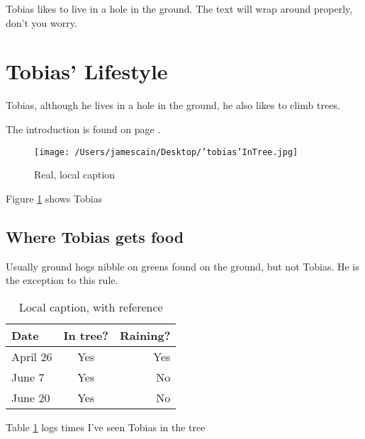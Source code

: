 \documentclass{article}
\begin{document}
Tobias likes to live in a hole in the ground. The text will wrap around properly, don't you worry.

\lipsum[1]


\newpage
\section{Tobias' Lifestyle}
Tobias, although he lives in a hole in the ground, he also likes to climb trees.

The introduction is found on page \pageref{sec:intro}.

\begin{figure}[H]
    \centering
    \texttt{[image: /Users/jamescain/Desktop/'tobias'InTree.jpg]}
    \caption[Optional caption]{Real, local caption}
    \label{fig:tobias}
\end{figure}

Figure \ref{fig:tobias} shows Tobias

\subsection{Where Tobias gets food}
Usually ground hogs nibble on greens found on the ground, but not Tobias. He is the exception to this rule.

\begin{table}[H]
    \centering
    \caption[This is optional caption, without reference]{Local caption, with reference}
    \label{tab:tobiastreesightings}
    \begin{tabular}{ l c r}
        \bfseries{Date} & In tree? & Raining? \\ \hline
        April 26 & Yes & Yes \\
        June 7 & Yes & No \\
        June 20 & Yes & No \\
    \end{tabular}
\end{table}

Table \ref{tab:tobiastreesightings} logs times I've seen Tobias in the tree
\end{document}
